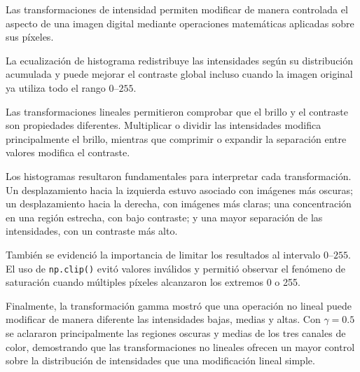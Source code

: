 \documentclass[11pt,letterpaper]{article}
\begin{document}
Las transformaciones de intensidad permiten modificar de manera controlada el aspecto de una imagen digital mediante operaciones matemáticas aplicadas sobre sus píxeles.

La ecualización de histograma redistribuye las intensidades según su distribución acumulada y puede mejorar el contraste global incluso cuando la imagen original ya utiliza todo el rango $0$--$255$.

Las transformaciones lineales permitieron comprobar que el brillo y el contraste son propiedades diferentes. Multiplicar o dividir las intensidades modifica principalmente el brillo, mientras que comprimir o expandir la separación entre valores modifica el contraste.

Los histogramas resultaron fundamentales para interpretar cada transformación. Un desplazamiento hacia la izquierda estuvo asociado con imágenes más oscuras; un desplazamiento hacia la derecha, con imágenes más claras; una concentración en una región estrecha, con bajo contraste; y una mayor separación de las intensidades, con un contraste más alto.

También se evidenció la importancia de limitar los resultados al intervalo $0$--$255$. El uso de \texttt{np.clip()} evitó valores inválidos y permitió observar el fenómeno de saturación cuando múltiples píxeles alcanzaron los extremos 0 o 255.

Finalmente, la transformación gamma mostró que una operación no lineal puede modificar de manera diferente las intensidades bajas, medias y altas. Con $\gamma=0.5$ se aclararon principalmente las regiones oscuras y medias de los tres canales de color, demostrando que las transformaciones no lineales ofrecen un mayor control sobre la distribución de intensidades que una modificación lineal simple.
\end{document}
